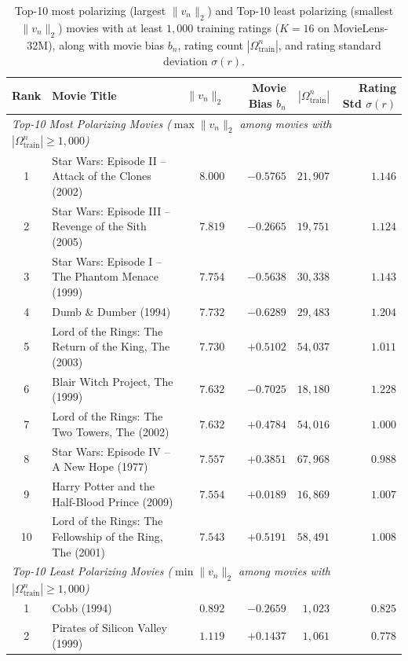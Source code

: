 \documentclass{article}
\theoremstyle{plain}
\theoremstyle{definition}
\begin{document}
\begin{table}[t]
\caption{Top-10 most polarizing (largest $\|v_n\|_2$) and Top-10 least polarizing (smallest $\|v_n\|_2$) movies with at least $1{,}000$ training ratings ($K=16$ on MovieLens-32M), along with movie bias $b_n$, rating count $|\Omega_{\text{train}}^n|$, and rating standard deviation $\sigma(r)$.}
\label{tab:polarizing_movies}
\vskip 0.1in
\begin{center}
\begin{small}
\begin{tabular}{clrrrr}
\toprule
\textbf{Rank} & \textbf{Movie Title} & $\|v_n\|_2$ & \textbf{Movie Bias} $b_n$ & $|\Omega_{\text{train}}^n|$ & \textbf{Rating Std} $\sigma(r)$ \\
\midrule
\multicolumn{6}{l}{\emph{Top-10 Most Polarizing Movies ($\max \|v_n\|_2$ among movies with $|\Omega_{\text{train}}^n| \ge 1,000$)}} \\
1 & Star Wars: Episode II -- Attack of the Clones (2002) & $8.000$ & $-0.5765$ & $21,907$ & $1.146$ \\
2 & Star Wars: Episode III -- Revenge of the Sith (2005) & $7.819$ & $-0.2665$ & $19,751$ & $1.124$ \\
3 & Star Wars: Episode I -- The Phantom Menace (1999) & $7.754$ & $-0.5638$ & $30,338$ & $1.143$ \\
4 & Dumb \& Dumber (1994) & $7.732$ & $-0.6289$ & $29,483$ & $1.204$ \\
5 & Lord of the Rings: The Return of the King, The (2003) & $7.730$ & $+0.5102$ & $54,037$ & $1.011$ \\
6 & Blair Witch Project, The (1999) & $7.632$ & $-0.7025$ & $18,180$ & $1.228$ \\
7 & Lord of the Rings: The Two Towers, The (2002) & $7.632$ & $+0.4784$ & $54,016$ & $1.000$ \\
8 & Star Wars: Episode IV -- A New Hope (1977) & $7.557$ & $+0.3851$ & $67,968$ & $0.988$ \\
9 & Harry Potter and the Half-Blood Prince (2009) & $7.554$ & $+0.0189$ & $16,869$ & $1.007$ \\
10 & Lord of the Rings: The Fellowship of the Ring, The (2001) & $7.543$ & $+0.5191$ & $58,491$ & $1.008$ \\
\midrule
\multicolumn{6}{l}{\emph{Top-10 Least Polarizing Movies ($\min \|v_n\|_2$ among movies with $|\Omega_{\text{train}}^n| \ge 1,000$)}} \\
1 & Cobb (1994) & $0.892$ & $-0.2659$ & $1,023$ & $0.825$ \\
2 & Pirates of Silicon Valley (1999) & $1.119$ & $+0.1437$ & $1,061$ & $0.778$ \\

\end{tabular}
\end{small}
\end{center}
\end{table}
\end{document}
